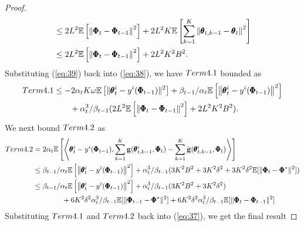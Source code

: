 \documentclass{article} %
\def\eqref#1{equation~\ref{#1}}
\theoremstyle{plain}
\theoremstyle{definition}
\theoremstyle{remark}
\renewcommand{\eqref}[1]{(\ref{#1})}
\begin{document}
{\begin{proof}
\begin{align}
   &\leq 2L^2\mathbb{E}\left[\left\|\pmb{\Phi}_t-\pmb{\Phi}_{t-1}\right\|^2\right]+2L^2K\mathbb{E}\left[\sum_{k=1}^K\left\|\pmb{\theta}_{t,k-1}-\pmb{\theta}_t\right\|^2\right]\nonumber\allowdisplaybreaks\\
   &\leq 2L^2\mathbb{E}\left[\left\|\pmb{\Phi}_t-\pmb{\Phi}_{t-1}\right\|^2\right]+2L^2K^2B^2.
\end{align}
Substituting \eqref{eq:39} back into \eqref{eq:38}, we have $\textnormal{Term {4.1}}$ bounded as
\begin{align}\label{eq:40}
    \textnormal{Term {4.1}}&\leq -2\alpha_tK\omega\mathbb{E}\left[\|\pmb{\theta}_t^i-y^i(\pmb{\Phi}_{t-1})\|^2\right]+\beta_{t-1}/\alpha_t\mathbb{E}\left[\left\|\pmb{\theta}_{t}^i-y^i(\pmb{\Phi}_{t-1})\right\|^2 \right]\nonumber\allowdisplaybreaks\\
    &\qquad+\alpha_t^3/\beta_{t-1}(2L^2\mathbb{E}\left[\left\|\pmb{\Phi}_t-\pmb{\Phi}_{t-1}\right\|^2\right]+2L^2K^2B^2).
\end{align}
We next bound $\textnormal{Term {4.2}}$ as 
\begin{align}
    \textnormal{Term {4.2}}&=2\alpha_t\mathbb{E}\left[\left\langle\pmb{\theta}_{t}^i-y^i(\pmb{\Phi}_{t-1}), \sum_{k=1}^K{\bg}(\pmb{\theta}_{t,k-1}^i,\pmb{\Phi}_t)-\sum_{k=1}^K\bar{\bg}(\pmb{\theta}_{t,k-1}^i,\pmb{\Phi}_t)\right\rangle\right]\nonumber\allowdisplaybreaks\\
    &\leq \beta_{t-1}/\alpha_t\mathbb{E}\left[\left\|\pmb{\theta}_{t}^i-y^i(\pmb{\Phi}_{t-1})\right\|^2 \right]+\alpha_t^3/\beta_{t-1}(3K^2B^2+3K^2\delta^2+3K^2\delta^2\mathbb{E}[\|\pmb{\Phi}_t-\pmb{\Phi}^*\|^2])\nonumber\allowdisplaybreaks\\
    &\leq \beta_{t-1}/\alpha_t\mathbb{E}\left[\left\|\pmb{\theta}_{t}^i-y^i(\pmb{\Phi}_{t-1})\right\|^2 \right]+\alpha_t^3/\beta_{t-1}(3K^2B^2+3K^2\delta^2)\nonumber\allowdisplaybreaks\\
    &\qquad\qquad+6K^2\delta^2\alpha_t^3/\beta_{t-1}\mathbb{E}[\|\pmb{\Phi}_{t-1}-\pmb{\Phi}^*\|^2]+6K^2\delta^2\alpha_t^3/\beta_{t-1}\mathbb{E}[\|\pmb{\Phi}_{t}-\pmb{\Phi}_{t-1}\|^2]
\end{align}
Substituting $\textnormal{Term {4.1}}$ and $\textnormal{Term {4.2}}$ back into \eqref{eq:37}, we get the final result


\end{proof}}
\end{document}
